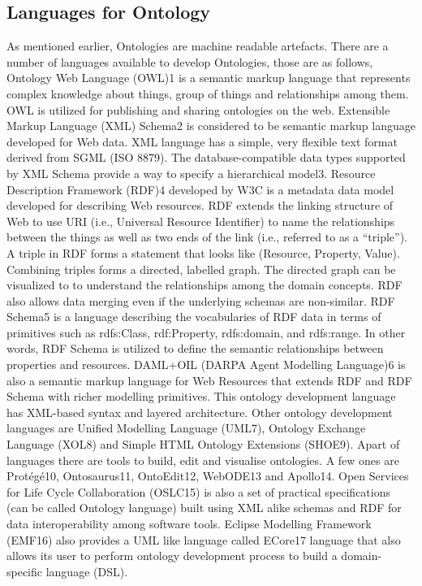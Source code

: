 \subsection{Languages for Ontology}
As mentioned earlier, Ontologies are machine readable artefacts. There are a number of languages available to develop Ontologies, those are as follows,
Ontology Web Language (OWL)1 is a semantic markup language that represents complex knowledge about things, group of things and relationships among them. OWL is utilized for publishing and sharing ontologies on the web.
Extensible Markup Language (XML) Schema2 is considered to be semantic markup language developed for Web data. XML language has a simple, very flexible text format derived from SGML (ISO 8879). The database-compatible data types supported by XML Schema provide a way to specify a hierarchical model3.
Resource Description Framework (RDF)4 developed by W3C is a metadata data model developed for describing Web resources. RDF extends the linking structure of Web to use URI (i.e., Universal Resource Identifier) to name the relationships between the things as well as two ends of the link (i.e., referred to as a “triple”). A triple in RDF forms a statement that looks like (Resource, Property, Value). Combining triples forms a directed, labelled graph. The directed graph can be visualized to to understand the relationships among the domain concepts. RDF also allows data merging even if the underlying schemas are non-similar.
RDF Schema5 is a language describing the vocabularies of RDF data in terms of primitives such as rdfs:Class, rdf:Property, rdfs:domain, and rdfs:range. In other words, RDF Schema is utilized to define the semantic relationships between properties and resources.
 DAML+OIL (DARPA Agent Modelling Language)6 is also a semantic markup language for Web Resources that extends RDF and RDF Schema with richer modelling primitives. This ontology development language has XML-based syntax and layered architecture.
 Other ontology development languages are Unified Modelling Language (UML7), Ontology Exchange Language (XOL8) and Simple HTML Ontology Extensions (SHOE9). Apart of languages there are tools to build, edit and visualise ontologies. A few ones are Protégé10, Ontosaurus11, OntoEdit12, WebODE13 and Apollo14. Open Services for Life Cycle Collaboration (OSLC15) is also a set of practical specifications (can be called Ontology language) built using XML alike schemas and RDF for data interoperability among software tools. Eclipse Modelling Framework (EMF16) also provides a UML like language called ECore17 language that also allows its user to perform ontology development process to build a domain-specific language (DSL).
